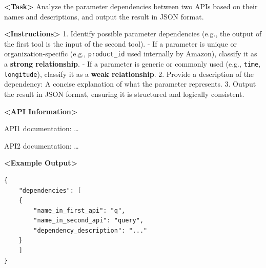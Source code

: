 \begin{table}[htbp]
    \centering
    \label{tab:analyze_api_dependencies} %
    \begin{tcolorbox}[colback=bgcolor, colframe=black, width=0.95\textwidth, boxrule=0.5mm, 
    coltitle=white, colbacktitle=titlecolor, title=Task: Analyze API Dependencies]
    
    \textbf{<Task>} Analyze the parameter dependencies between two APIs based on their names and descriptions, and output the result in JSON format.
    
    \textbf{<Instructions>}
    1. Identify possible parameter dependencies (e.g., the output of the first tool is the input of the second tool).  
       - If a parameter is unique or organization-specific (e.g., \texttt{product\_id} used internally by Amazon), classify it as a \textbf{strong relationship}.  
       - If a parameter is generic or commonly used (e.g., \texttt{time}, \texttt{longitude}), classify it as a \textbf{weak relationship}.  
    2. Provide a description of the dependency: A concise explanation of what the parameter represents.  
    3. Output the result in JSON format, ensuring it is structured and logically consistent.  
    
    \vspace{0.5em}
    
    \textbf{<API Information>} 

    API1 documentation: \dots

    API2 documentation: \dots 
    
    \vspace{0.5em}
    
    \textbf{<Example Output>}  
    
    \begin{verbatim}
{
    "dependencies": [
    {
        "name_in_first_api": "q",
        "name_in_second_api": "query",
        "dependency_description": "..."
    }
    ]
}
    \end{verbatim}
    
    \end{tcolorbox}
\end{table}


